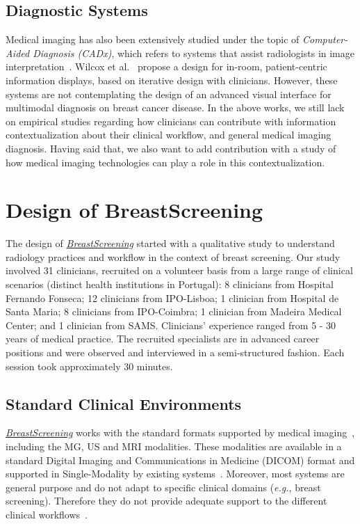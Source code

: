 \subsection{Diagnostic Systems}

Medical imaging has also been extensively studied under the topic of \textit{Computer-Aided Diagnosis (CADx)}, which refers to systems that assist radiologists in image interpretation~\cite{Oram:2014:CDR:2598510.2598585, 10.1145/3359206}.
Wilcox et al.~\cite{Wilcox:2010:DPI:1753326.1753650} propose a design for in-room, patient-centric information displays, based on iterative design with clinicians.
However, these systems are not contemplating the design of an advanced visual interface for multimodal diagnosis on breast cancer disease.
In the above works, we still lack on empirical studies regarding how clinicians can contribute with information contextualization about their clinical workflow, and general medical imaging diagnosis.
Having said that, we also want to add contribution with a study of how medical imaging technologies can play a role in this contextualization. \section{Design of BreastScreening}
\label{sec:sec003}

The design of \href{https://breastscreening.github.io/}{{\it BreastScreening}} started with a qualitative study to understand radiology practices and workflow in the context of breast screening.
Our study involved 31 clinicians, recruited on a volunteer basis from a large range of clinical scenarios (distinct health institutions in Portugal):
8 clinicians from Hospital Fernando Fonseca; 12 clinicians from IPO-Lisboa; 1 clinician from Hospital de Santa Maria; 8 clinicians from IPO-Coimbra; 1 clinician from Madeira Medical Center; and 1 clinician from SAMS. Clinicians' experience ranged from 5 - 30 years of medical practice.
The recruited specialists are in advanced career positions and were observed and interviewed in a semi-structured fashion.
Each session took approximately 30 minutes.

\subsection{Standard Clinical Environments}

\href{https://breastscreening.github.io/}{{\it BreastScreening}} works with the standard formats supported by medical imaging~\cite{ng2017technical}, including the MG, US and MRI modalities.
These modalities are available in a standard  Digital Imaging and Communications in Medicine (DICOM) format and supported in Single-Modality by existing systems~\cite{henriksen2018efficacy}. Moreover, most systems are general purpose and do not adapt to specific clinical domains ({\it e.g.}, breast screening). Therefore they do not provide adequate support to the different clinical workflows~\cite{Calisto:2017:TTM:3132272.3134111}.

